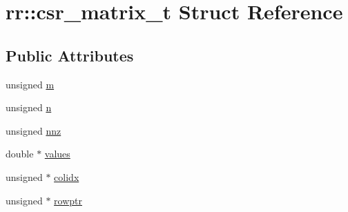 \hypertarget{structrr_1_1csr__matrix__t}{\section{rr\-:\-:csr\-\_\-matrix\-\_\-t Struct Reference}
\label{structrr_1_1csr__matrix__t}
}
\subsection*{Public Attributes}
\begin{DoxyCompactItemize}
\item 
unsigned \hyperlink{structrr_1_1csr__matrix__t_a649049dcf50b83aba245e008d4991038}{m}
\item 
unsigned \hyperlink{structrr_1_1csr__matrix__t_af55d6f915237d4fbf1d99d515abce8a5}{n}
\item 
unsigned \hyperlink{structrr_1_1csr__matrix__t_a18c05b074c76a960debc0cfa33b8757a}{nnz}
\item 
double $\ast$ \hyperlink{structrr_1_1csr__matrix__t_a0d2c69751a73afdfa97a44f3093a070c}{values}
\item 
unsigned $\ast$ \hyperlink{structrr_1_1csr__matrix__t_aef6ab9aaaba240f9ad7d333bca1ff71a}{colidx}
\item 
unsigned $\ast$ \hyperlink{structrr_1_1csr__matrix__t_ac4f924004760ce3905ab171a054813c0}{rowptr}
\end{DoxyCompactItemize}


